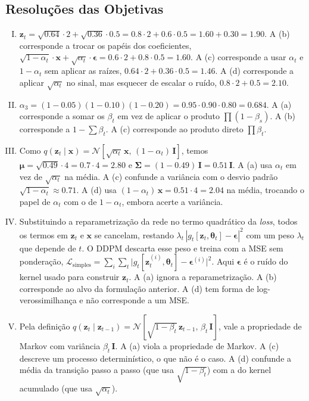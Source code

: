 \documentclass{dlproblemset}
\newcommand{\thetav}{\boldsymbol{\theta}}
\begin{document}
\subsection*{Resoluções das Objetivas}
\color{blue}
\begin{enumerate}[I)]
    \item $\mathbf{z}_t = \sqrt{0.64}\cdot 2 + \sqrt{0.36}\cdot 0.5 = 0.8\cdot 2 + 0.6\cdot 0.5 = 1.60 + 0.30 = 1.90$. A (b) corresponde a trocar os papéis dos coeficientes, $\sqrt{1 - \alpha_t}\cdot \mathbf{x} + \sqrt{\alpha_t}\cdot \boldsymbol{\epsilon} = 0.6\cdot 2 + 0.8\cdot 0.5 = 1.60$. A (c) corresponde a usar $\alpha_t$ e $1 - \alpha_t$ sem aplicar as raízes, $0.64\cdot 2 + 0.36\cdot 0.5 = 1.46$. A (d) corresponde a aplicar $\sqrt{\alpha_t}$ no sinal, mas esquecer de escalar o ruído, $0.8\cdot 2 + 0.5 = 2.10$.
    \item $\alpha_3 = (1 - 0.05)(1 - 0.10)(1 - 0.20) = 0.95 \cdot 0.90 \cdot 0.80 = 0.684$. A (a) corresponde a somar os $\beta_t$ em vez de aplicar o produto $\prod (1 - \beta_s)$. A (b) corresponde a $1 - \sum \beta_t$. A (c) corresponde ao produto direto $\prod \beta_t$.
    \item Como $q(\mathbf{z}_t \mid \mathbf{x}) = \mathcal{N}[\sqrt{\alpha_t}\,\mathbf{x},\,(1 - \alpha_t)\,\mathbf{I}]$, temos $\boldsymbol{\mu} = \sqrt{0.49}\cdot 4 = 0.7\cdot 4 = 2.80$ e $\boldsymbol{\Sigma} = (1 - 0.49)\,\mathbf{I} = 0.51\,\mathbf{I}$. A (a) usa $\alpha_t$ em vez de $\sqrt{\alpha_t}$ na média. A (c) confunde a variância com o desvio padrão $\sqrt{1 - \alpha_t} \approx 0.71$. A (d) usa $(1 - \alpha_t)\,\mathbf{x} = 0.51 \cdot 4 = 2.04$ na média, trocando o papel de $\alpha_t$ com o de $1 - \alpha_t$, embora acerte a variância.
    \item Substituindo a reparametrização da rede no termo quadrático da \textit{loss}, todos os termos em $\mathbf{z}_t$ e $\mathbf{x}$ se cancelam, restando $\lambda_t\,|g_t[\mathbf{z}_t,\thetav_t] - \boldsymbol{\epsilon}|^{2}$ com um peso $\lambda_t$ que depende de $t$. O DDPM descarta esse peso e treina com a MSE sem ponderação, $\mathcal{L}_{\text{simples}} = \sum_{i}\sum_{t} \big|g_t[\mathbf{z}_t^{(i)},\thetav_t] - \boldsymbol{\epsilon}^{(i)}\big|^{2}$. Aqui $\boldsymbol{\epsilon}$ é o ruído do kernel usado para construir $\mathbf{z}_t$. A (a) ignora a reparametrização. A (b) corresponde ao alvo da formulação anterior. A (d) tem forma de log-verossimilhança e não corresponde a um MSE.
    \item Pela definição $q(\mathbf{z}_t \mid \mathbf{z}_{t-1}) = \mathcal{N}[\sqrt{1 - \beta_t}\,\mathbf{z}_{t-1},\, \beta_t\,\mathbf{I}]$, vale a propriedade de Markov com variância $\beta_t\,\mathbf{I}$. A (a) viola a propriedade de Markov. A (c) descreve um processo determinístico, o que não é o caso. A (d) confunde a média da transição passo a passo (que usa $\sqrt{1 - \beta_t}$) com a do kernel acumulado (que usa $\sqrt{\alpha_t}$).

\end{enumerate}
\end{document}
